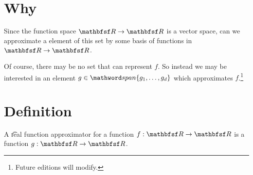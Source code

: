 

\section*{Why}

Since the function space $\R  \to \R $ is a vector space, can we approximate a  element of this set by some basis of  functions in $\R  \to \R $.

Of course, there may be no set that can represent $f$.
So instead we may be interested in an element $g \in \span\set{g_1, \dots , g_d}$ which approximates $f$.\footnote{Future editions will modify.}

\section*{Definition}

A \t{real function approximator} for a function $f: \R  \to \R $ is a function $g: \R  \to \R $.

\blankpage